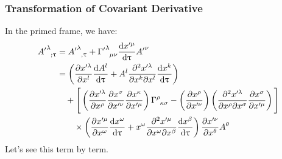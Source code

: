 \subsubsection{Transformation of Covariant Derivative}
In the primed frame, we have: 
\begin{align*}
\tensor{{A'}}{^\lambda _{;\uptau}} &= \tensor{{A'}}{^\lambda _{,\uptau}} + \tensor{{\Gamma'}}{^\lambda _{\mu \nu}} \dv{x'^\mu}{\uptau} \tensor{{A'}}{^\nu} \\
&= \left( \pdv{x'^\lambda}{x^l} \dv{A^l}{\uptau} 
+ A^l \pdv{x'^\lambda}{x^k}{x^l} \dv{x^k}{\uptau} \right) \\
&\quad + \Bigg[ 
\brac{\pdv{x'^\lambda}{x^\rho}\pdv{{x^\sigma}}{{x'^\nu}} \pdv{{x^\kappa}}{{x'^\mu}}}  \tensor{\Gamma}{^\rho _\kappa _\sigma} - \brac{\pdv{{x^\rho}}{{x'^\nu}}}\brac{\pdv{x'^\lambda}{x^\rho}{x^\sigma}\pdv{{x^\sigma}}{{x'^\mu}}}  \Bigg]
 \\
&\qquad \times \left( 
\pdv{x'^\mu}{x^\omega} \dv{x^\omega}{\uptau} 
+ x^\omega \pdv[2]{x'^\mu}{x^\omega}{x^\beta} \dv{x^\beta}{\uptau} 
\right)
\pdv{{x'^\nu}}{{x^\theta}} A^\theta
\end{align*}
Let's see this term by term. 
